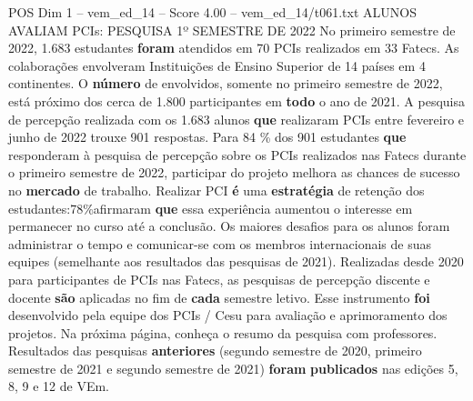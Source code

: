 \begin{textsample}{POS Dim 1 – vem\_ed\_14 – Score 4.00 – vem\_ed\_14/t061.txt}  \label{ex:f1_pos_155}
ALUNOS AVALIAM PCIs: PESQUISA 1º SEMESTRE DE 2022 No primeiro semestre de 2022, 1.683 estudantes \textbf{foram} atendidos em 70 PCIs realizados em 33 Fatecs.
As colaborações envolveram Instituições de Ensino Superior de 14 países em 4 continentes.
O \textbf{número} de envolvidos, somente no primeiro semestre de 2022, está próximo dos cerca de 1.800 participantes em \textbf{todo} o ano de 2021.
A pesquisa de percepção realizada com os 1.683 alunos \textbf{que} realizaram PCIs entre fevereiro e junho de 2022 trouxe 901 respostas.
Para 84 \% dos 901 estudantes \textbf{que} responderam à pesquisa de percepção sobre os PCIs realizados nas Fatecs durante o primeiro semestre de 2022, participar do projeto melhora as chances de sucesso no \textbf{mercado} de trabalho.
Realizar PCI \textbf{é} uma \textbf{estratégia} de retenção dos estudantes:78\%afirmaram \textbf{que} essa experiência aumentou o interesse em permanecer no curso até a conclusão.
Os maiores desafios para os alunos foram administrar o tempo e comunicar-se com os membros internacionais de suas equipes (semelhante aos resultados das pesquisas de 2021).
Realizadas desde 2020 para participantes de PCIs nas Fatecs, as pesquisas de percepção discente e docente \textbf{são} aplicadas no fim de \textbf{cada} semestre letivo.
Esse instrumento \textbf{foi} desenvolvido pela equipe dos PCIs / Cesu para avaliação e aprimoramento dos projetos.
Na próxima página, conheça o resumo da pesquisa com professores.
Resultados das pesquisas \textbf{anteriores} (segundo semestre de 2020, primeiro semestre de 2021 e segundo semestre de 2021) \textbf{foram} \textbf{publicados} nas edições 5, 8, 9 e 12 de VEm.

\end{textsample}
